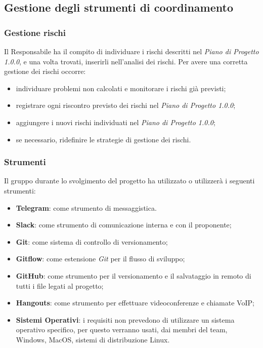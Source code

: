 	\subsection{Gestione degli strumenti di coordinamento}

		\subsubsection{Gestione rischi}
		Il Responsabile ha il compito di individuare i rischi descritti nel \textit{Piano di Progetto 1.0.0\docs}, e una volta trovati, inserirli nell'analisi dei rischi. Per avere una corretta gestione dei rischi occorre:
		\begin{itemize}
			\item individuare problemi non calcolati e monitorare i rischi già previsti;
			\item registrare ogni riscontro previsto dei rischi nel \textit{Piano di Progetto 1.0.0\docs};
			\item aggiungere i nuovi rischi individuati nel \textit{Piano di Progetto 1.0.0\docs};
			\item se necessario, ridefinire le strategie di gestione dei rischi.
		\end{itemize}  			
			
		\subsubsection{Strumenti}
			Il gruppo durante lo svolgimento del progetto ha utilizzato o utilizzerà i seguenti strumenti:
			\begin{itemize}
				\item \textbf{Telegram}: come strumento di messaggistica.
				\item \textbf{Slack\glos}: come strumento di comunicazione interna e con il proponente;
				\item \textbf{Git\glos}: come sistema di controllo di versionamento;
				\item \textbf{Gitflow\glos}: come estensione \textit{Git\glo} per il flusso di sviluppo;
				\item \textbf{GitHub\glos}: come strumento per il versionamento e il salvataggio in remoto di tutti i file legati al progetto;
				\item \textbf{Hangouts\glos}: come strumento per effettuare videoconferenze e chiamate VoIP;
				\item \textbf{Sistemi Operativi}: i requisiti non prevedono di utilizzare un sistema operativo specifico, per questo verranno usati, dai membri del team, Windows, MacOS, sistemi di distribuzione Linux.
			\end{itemize}

